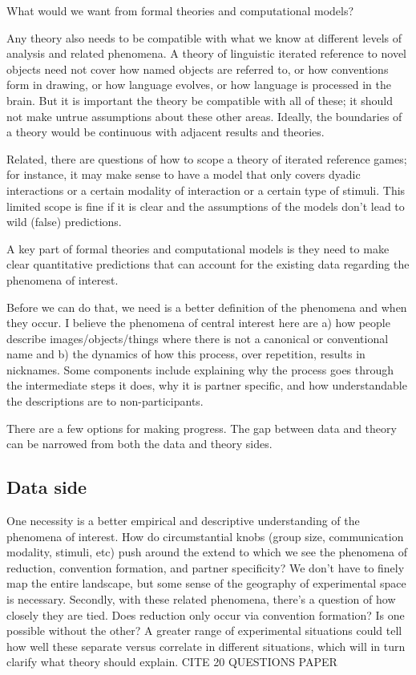 \documentclass[]{article}
\begin{document}
What would we want from formal theories and computational models?

Any theory also needs to be compatible with what we know at different levels of analysis and related phenomena. A theory of linguistic iterated reference to novel objects need not cover how named objects are referred to, or how conventions form in drawing, or how language evolves, or how language is processed in the brain. But it is important the theory be compatible with all of these; it should not make untrue assumptions about these other areas. Ideally, the boundaries of a theory would be continuous with adjacent results and theories. 

Related, there are questions of how to scope a theory of iterated reference games; for instance, it may make sense to have a model that only covers dyadic interactions or a certain modality of interaction or a certain type of stimuli. This limited scope is fine if it is clear and the assumptions of the models don't lead to wild (false) predictions. 
	
	A key part of formal theories and computational models is they need to make clear quantitative predictions that can account for the existing data regarding the phenomena of interest. 
	
	
	Before we can do that, we need is a better definition of the phenomena and when they occur. I believe the phenomena of central interest here are a) how people describe images/objects/things where there is not a canonical or conventional name and b) the dynamics of how this process, over repetition, results in nicknames. Some components include explaining why the process goes through the intermediate steps it does, why it is partner specific, and how understandable the descriptions are to non-participants. 
	
There are a few options for making progress. The gap between data and theory can be narrowed from both the data and theory sides. 

\subsection{Data side}
	
	One necessity is a better empirical and descriptive understanding of the phenomena of interest. How do circumstantial knobs (group size, communication modality, stimuli, etc) push around the extend to which we see the phenomena of reduction, convention formation, and partner specificity? We don't have to finely map the entire landscape, but some sense of the geography of experimental space is necessary. Secondly, with these related phenomena, there's a question of how closely they are tied. Does reduction only occur via convention formation? Is one possible without the other? A greater range of experimental situations could tell how well these separate versus correlate in different situations, which will in turn clarify what theory should explain. CITE 20 QUESTIONS PAPER
	
\end{document}
